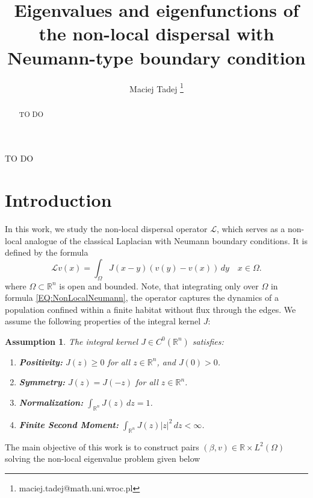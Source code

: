 \documentclass[11pt, a4paper]{article}
\title{Eigenvalues and eigenfunctions of the non-local dispersal with Neumann-type boundary condition}
\author[1]{Maciej Tadej \thanks{maciej.tadej@math.uni.wroc.pl}}
\affil[1]{\textit{Institute of Mathematics, University of Wrocław, pl. Grunwaldzki 2, 50-384 Wrocław, Poland}}
\date{}
\theoremstyle{break}
\theoremstyle{break}
\theoremstyle{break}
\newtheorem{asm}{Assumption}[section]
\theoremstyle{break}
\theoremstyle{break}
\theoremstyle{break}
\theoremstyle{break}
\theoremstyle{break}
\theoremstyle{break}
\theoremstyle{break}
\begin{document}
\maketitle

\hspace{20pt}

\begin{abstract}
TO DO
\end{abstract}

\begin{keywords}
TO DO
\end{keywords}

\newpage

\section{Introduction}

In this work, we study the non-local dispersal operator $\mathcal{L}$, which serves as a non-local analogue of the classical Laplacian with Neumann boundary conditions. It is defined by the formula
\begin{equation}
    \label{EQ:NonLocalNeumann}
    \mathcal{L}v(x) = \int_{\Omega} J(x-y) (v(y) - v(x)) \, dy \quad x \in \Omega.
\end{equation}
where $\Omega \subset \mathbb{R}^n$ is open and bounded. Note, that integrating only over $\Omega$ in formula \eqref{EQ:NonLocalNeumann}, the operator captures the dynamics of a population confined within a finite habitat without flux through the edges. We assume the following properties of the integral kernel $J$:

\begin{asm} \label{asm:KernelProperties}
    The integral kernel $J \in C^0(\mathbb{R}^n)$ satisfies:
    \begin{enumerate}[label=(\textit{J\arabic*})]
        \item \textbf{Positivity:} $J(z) \geq 0$ for all $z \in \mathbb{R}^n$, and $J(0) > 0$.
        \item \textbf{Symmetry:} $J(z) = J(-z)$ for all $z \in \mathbb{R}^n$.
        \item \textbf{Normalization:} $\int_{\mathbb{R}^n} J(z) \, dz = 1$.
        \item \textbf{Finite Second Moment:} $\int_{\mathbb{R}^n} J(z)|z|^2 \, dz < \infty$.
    \end{enumerate}
\end{asm}

The main objective of this work is to construct pairs $(\beta, v) \in \mathbb{R}\times L^2(\Omega)$ solving the non-local eigenvalue problem given below
\end{document}
